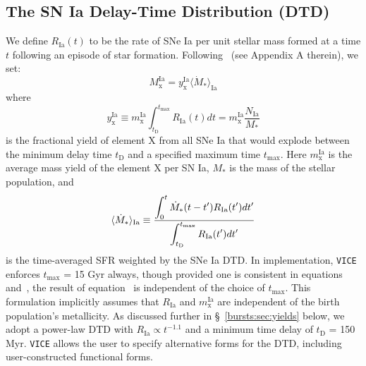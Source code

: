 \subsection{The SN Ia Delay-Time Distribution (DTD)} 
\label{bursts:sec:dtd} 
We define $R_\text{Ia}(t)$ to be the rate of SNe Ia per unit stellar mass 
formed at a time $t$ following an episode of star formation. 
Following~\citet{Weinberg2017b} (see Appendix A therein), we set: 
\begin{equation} 
\label{bursts:eq:mdot_ia} 
M_\text{x}^\text{Ia} = y_\text{x}^\text{Ia}\langle\dot{M}_*\rangle_\text{Ia} 
\end{equation} 
where 
\begin{equation} 
\label{bursts:eq:y_x_Ia} 
y_\text{x}^\text{Ia} \equiv m_\text{x}^\text{Ia} 
\int_{t_\text{D}}^{t_\text{max}} R_\text{Ia}(t)dt = 
m_\text{x}^\text{Ia}\frac{N_\text{Ia}}{M_*} 
\end{equation} 
is the fractional yield of element X from all SNe Ia that would explode 
between the minimum delay time $t_\text{D}$ and a specified maximum time 
$t_\text{max}$. Here $m_\text{x}^\text{Ia}$ is the average mass yield of the 
element X per SN Ia, $M_*$ is the mass of the stellar population, and 
\begin{equation}
\label{bursts:eq:mdotstarIa} 
\langle\dot{M}_*\rangle_\text{Ia} \equiv \frac{\displaystyle{
	\int_0^t \dot{M}_*(t - t')R_\text{Ia}(t')dt' 
}}{\displaystyle{
	\int_{t_\text{D}}^{t_\text{max}} R_\text{Ia}(t')dt' 
}} 
\end{equation} 
is the time-averaged SFR weighted by the SNe Ia DTD. In implementation, 
\texttt{VICE} enforces $t_\text{max}$ = 15 Gyr always, though provided one is 
consistent in equations~ and~, the result 
of equation~ is independent of the choice of $t_\text{max}$. 
This formulation implicitly assumes that $R_\text{Ia}$ and 
$m_\text{x}^\text{Ia}$ are independent of the birth population's metallicity. 
As discussed further in \S~\ref{bursts:sec:yields} below, we adopt a power-law DTD 
with $R_\text{Ia} \propto t^{-1.1}$ and a minimum time delay of 
$t_\text{D}$ = 150 Myr. \texttt{VICE} allows the user to specify alternative 
forms for the DTD, including user-constructed functional forms. 

